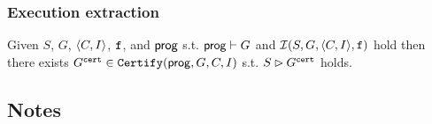 \documentclass[12pt]{article}
\begin{document}


          





  
    

\subsubsection{Execution extraction}

\begin{lemma}
  \label{lemma:sim-extract}
  Given $S$, $G$, $\langle C, I \rangle$, ${\mathtt{f}}$, and $\mathsf{prog}$ 
  s.t. $\mathsf{prog} \vdash G$ and $\mathcal{I}(S, G, \langle C, I \rangle, {\mathtt{f}})$ hold
  then there exists $G^{{\mathtt{cert}}} \in {\mathtt{Certify}}(\mathsf{prog}, G, C, I)$ s.t.
  $S \rhd G^{{\mathtt{cert}}}$ holds.
\end{lemma}

\subsection{Notes}
\end{document}
